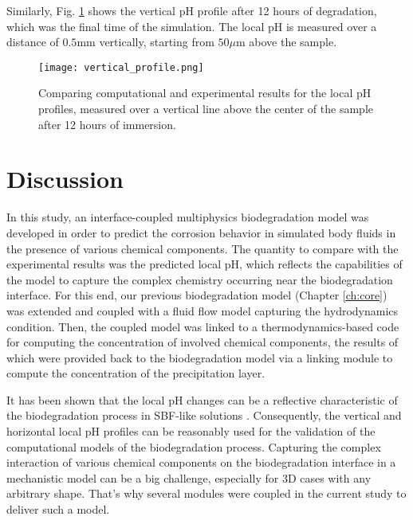Similarly, Fig. \ref{fig:kinetics_vertical_profile} shows the vertical pH profile after 12 hours of degradation, which was the final time of the simulation. The local pH is measured over a distance of $0.5 \mathrm{mm}$ vertically, starting from $50 \mu\mathrm{m}$ above the sample.

\begin{figure}[h]
\centering
\medskip
\texttt{[image: vertical\_profile.png]}
\caption[Comparing computational and experimental vertical pH profiles]{Comparing computational and experimental results for the local pH profiles, measured over a vertical line above the center of the sample after 12 hours of immersion.} \label{fig:kinetics_vertical_profile}
\end{figure}

\section{Discussion}

In this study, an interface-coupled multiphysics biodegradation model was developed in order to predict the corrosion behavior in simulated body fluids in the presence of various chemical components. The quantity to compare with the experimental results was the predicted local pH, which reflects the capabilities of the model to capture the complex chemistry occurring near the biodegradation interface. For this end, our previous biodegradation model \cite{Barzegari2021} (Chapter \ref{ch:core}) was extended and coupled with a fluid flow model capturing the hydrodynamics condition. Then, the coupled model was linked to a thermodynamics-based code for computing the concentration of involved chemical components, the results of which were provided back to the biodegradation model via a linking module to compute the concentration of the precipitation layer.

It has been shown that the local pH changes can be a reflective characteristic of the biodegradation process in \gls{SBF}-like solutions \cite{Gonzalez2021,Wang2022}. Consequently, the vertical and horizontal local pH profiles can be reasonably used for the validation of the computational models of the biodegradation process. Capturing the complex interaction of various chemical components on the biodegradation interface in a mechanistic model can be a big challenge, especially for 3D cases with any arbitrary shape. That's why several modules were coupled in the current study to deliver such a model.

